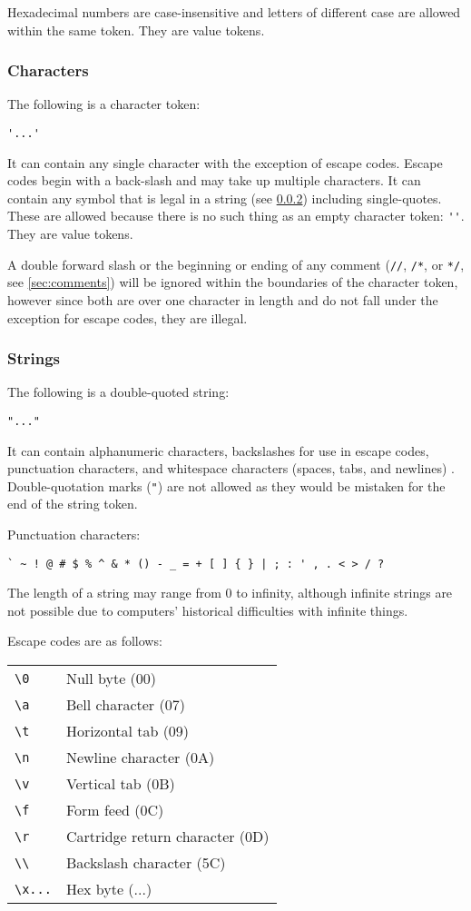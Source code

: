 \documentclass[10pt,a4paper]{article}
\begin{document}
Hexadecimal numbers are case-insensitive and letters of different case are allowed within the same token. They are value tokens.

\subsubsection{Characters}
\label{sec:characters}
The following is a character token:
\begin{verbatim}
'...'
\end{verbatim}

It can contain any single character with the exception of escape codes. Escape codes begin with a back-slash and may take up multiple characters. It can contain any symbol that is legal in a string (see \ref{sec:strings}) including single-quotes. These are allowed because there is no such thing as an empty character token: \verb|''|. They are value tokens.

A double forward slash or the beginning or ending of any comment (\verb|//|, \verb|/*|, or \verb|*/|, see \ref{sec:comments}) will be ignored within the boundaries of the character token, however since both are over one character in length and do not fall under the exception for escape codes, they are illegal.

\subsubsection{Strings}
\label{sec:strings}
The following is a double-quoted string:
\begin{verbatim}
"..."
\end{verbatim}
It can contain alphanumeric characters, backslashes for use in escape codes, punctuation characters, and whitespace characters (spaces, tabs, and newlines) . Double-quotation marks (\verb|"|) are not allowed as they would be mistaken for the end of the string token.

Punctuation characters:
\begin{verbatim}
` ~ ! @ # $ % ^ & * () - _ = + [ ] { } | ; : ' , . < > / ?
\end{verbatim}

The length of a string may range from 0 to infinity, although infinite strings are not possible due to computers' historical difficulties with infinite things. 

Escape codes are as follows:

\begin{tabular}{l l}
\verb|\0| & Null byte (00) \\
\verb|\a| & Bell character (07) \\
\verb|\t| & Horizontal tab (09) \\
\verb|\n| & Newline character (0A) \\
\verb|\v| & Vertical tab (0B) \\
\verb|\f| & Form feed (0C) \\
\verb|\r| & Cartridge return character (0D) \\
\verb|\\| & Backslash character (5C) \\
\verb|\x...| & Hex byte (...) \\
\end{tabular}
\end{document}
